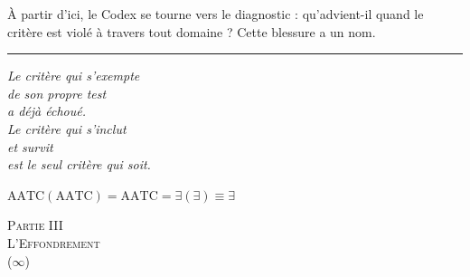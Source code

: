 \documentclass[10pt, openany, oneside]{book}
\renewcommand{\normalsize}{\fontsize{10}{13}\selectfont}
\renewcommand{\large}{\fontsize{11.5}{14}\selectfont}
\renewcommand{\LARGE}{\fontsize{15}{18}\selectfont}
\begin{document}
À partir d'ici, le Codex se tourne vers le diagnostic : qu'advient-il quand le critère est violé à travers tout domaine ? Cette blessure a un nom.

\vspace{2em}

\begin{center}
    \rule{0.15\textwidth}{0.3pt}
\end{center}

\vspace{0.5em}

\begin{center}
    \itshape
    Le critère qui s'exempte\\
    de son propre test\\
    a déjà échoué.\\[0.8em]
    Le critère qui s'inclut\\
    et survit\\
    est le seul critère qui soit.
\end{center}

\vspace{0.5em}

\begin{center}
    $\text{AATC}(\text{AATC}) = \text{AATC} = \exists(\exists) \equiv \exists$
\end{center}


\newpage
\thispagestyle{empty}
\vspace*{\fill}
\begin{center}
    {\LARGE\scshape Partie III}\\[1em]
    {\large\scshape L'Effondrement}\\[0.5em]
    {\normalsize ($\infty$)}
\end{center}
\vspace*{\fill}
\newpage

%
%
%
%
\end{document}

